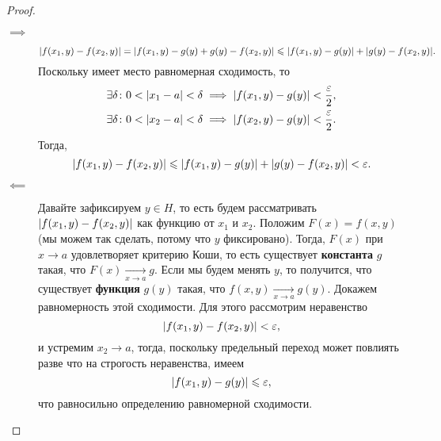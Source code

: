 \begin{proof}
    \begin{description}
        \item[$\implies$]
        \[
            \abs{f(x_{1}, y) - f(x_{2}, y)} = \abs{f(x_{1}, y) - g(y) + g(y) - f(x_{2}, y)} \leqslant \abs{f(x_{1}, y) - g(y)} + \abs{g(y) - f(x_{2}, y)}.
        \]
        Поскольку имеет место равномерная сходимость, то
        \begin{align}
            \exists \delta \colon 0 < \abs{x_{1} - a} < \delta &\implies \abs{f(x_{1}, y) - g(y)} < \frac{\varepsilon}{2}, \\
            \exists \delta \colon 0 < \abs{x_{2} - a} < \delta &\implies \abs{f(x_{2}, y) - g(y)} < \frac{\varepsilon}{2}.
        \end{align}
        Тогда,
        \[
            \abs{f(x_{1}, y) - f(x_{2}, y)} \leqslant \abs{f(x_{1}, y) - g(y)} + \abs{g(y) - f(x_{2}, y)} < \varepsilon.
        \]
        \item[$\impliedby$] Давайте зафиксируем $y \in H$, то есть будем рассматривать $\abs{f(x_{1}, y) - f(x_{2}, y)}$ как функцию от $x_{1}$ и $x_{2}$.
        Положим $F(x) = f(x, y)$ (мы можем так сделать, потому что $y$ фиксировано).
        Тогда, $F(x)$ при $x \to a$ удовлетворяет критерию Коши, то есть существует {\bf константа} $g$ такая, что $F(x) \underset{x \to a}{\to} g$.
        Если мы будем менять $y$, то получится, что существует {\bf функция} $g(y)$ такая, что $f(x, y) \underset{x \to a}{\to} g(y)$.
        Докажем равномерность этой сходимости.
        Для этого рассмотрим неравенство
        \[
            \abs{f(x_{1}, y) - f(x_{2}, y)} < \varepsilon,
        \]
        и устремим $x_{2} \to a$, тогда, поскольку предельный переход может повлиять разве что на строгость неравенства, имеем
        \[
            \abs{f(x_{1}, y) - g(y)} \leqslant \varepsilon,
        \]
        что равносильно определению равномерной сходимости.
    \end{description}
\end{proof}










